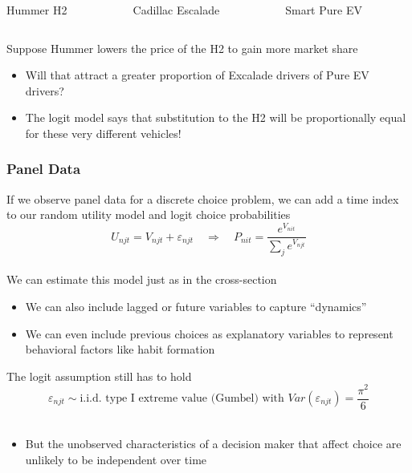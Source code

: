 \documentclass{beamer}\usepackage[]{graphicx}\usepackage[]{color}
\begin{document}
\begin{frame}
\begin{columns}
\begin{column}{0.333\textwidth}
    	\end{column}
    \end{columns}
    \begin{columns}
    	\begin{column}{0.333\textwidth}
    		\centering Hummer H2
    	\end{column}
    	\begin{column}{0.333\textwidth}
    		\centering Cadillac Escalade
    	\end{column}
    	\begin{column}{0.333\textwidth}
    		\centering Smart Pure EV
    	\end{column}
    \end{columns}
    \vspace{3ex}
    Suppose Hummer lowers the price of the H2 to gain more market share
    \begin{itemize}
    	\item Will that attract a greater proportion of Excalade drivers of Pure EV drivers?
    	\item The logit model says that substitution to the H2 will be proportionally equal for these very different vehicles!
    \end{itemize}
\end{frame}

\begin{frame}\frametitle{Panel Data}
    If we observe panel data for a discrete choice problem, we can add a time index to our random utility model and logit choice probabilities
    $$U_{njt} = V_{njt} + \varepsilon_{njt} \quad \Rightarrow \quad P_{nit} = \frac{e^{V_{nit}}}{\sum_j e^{V_{njt}}}$$ \\
    \vspace{2ex}
    We can estimate this model just as in the cross-section
    \begin{itemize}
    	\item We can also include lagged or future variables to capture ``dynamics''
    	\item We can even include previous choices as explanatory variables to represent behavioral factors like habit formation
    \end{itemize}
    \vspace{2ex}
    The logit assumption still has to hold
    $$\varepsilon_{njt} \sim \text{i.i.d.\ type I extreme value (Gumbel) with } Var(\varepsilon_{njt}) = \frac{\pi^2}{6}$$ \\
    \begin{itemize}
    	\item But the unobserved characteristics of a decision maker that affect choice are unlikely to be independent over time
    \end{itemize}
\end{frame}
\end{document}
